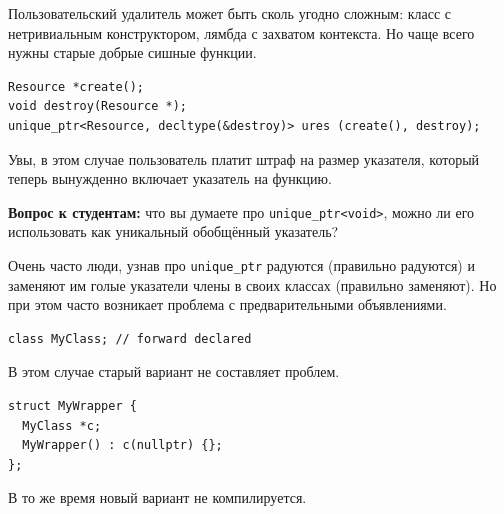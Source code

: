 \documentclass[a4paper,12pt,oneside]{article}
\newif\ifanswers
\begin{document}
\ifanswers
Правильный ответ: например так

\begin{lstlisting}
template <typename T> struct MyArrDeleter {
  void operator()(T *t) { delete [] t; }
};

unique_ptr<int, MyArrDeleter<int>> ui3 (new int[1000]());
\end{lstlisting}

Но хороший студент напишет через лямбду
\fi

Пользовательский удалитель может быть сколь угодно сложным: класс с нетривиальным конструктором, лямбда с захватом контекста. Но чаще всего нужны старые добрые сишные функции.

\begin{lstlisting}
Resource *create();
void destroy(Resource *);
unique_ptr<Resource, decltype(&destroy)> ures (create(), destroy);
\end{lstlisting}

Увы, в этом случае пользователь платит штраф на размер указателя, который теперь вынужденно включает указатель на функцию.

\textbf{Вопрос к студентам:} что вы думаете про \lstinline!unique_ptr<void>!, можно ли его использовать как уникальный обобщённый указатель?

\ifanswers
Проблемы, как водится, будут с удалением. Работать может примерно такая городушка:

\begin{lstlisting}
template <typename T>
struct VDel {
  void operator()(void *s) { delete static_cast<T*>(s); }
};
unique_ptr<void, VDel<int>> u(new int(42));
\end{lstlisting}
\fi

Очень часто люди, узнав про \lstinline!unique_ptr! радуются (правильно радуются) и заменяют им голые указатели члены в своих классах (правильно заменяют). Но при этом часто возникает проблема с предварительными объявлениями.

\begin{lstlisting}
class MyClass; // forward declared
\end{lstlisting}

В этом случае старый вариант не составляет проблем.

\begin{lstlisting}
struct MyWrapper {
  MyClass *c;
  MyWrapper() : c(nullptr) {};
};
\end{lstlisting}

В то же время новый вариант не компилируется.
\end{document}
